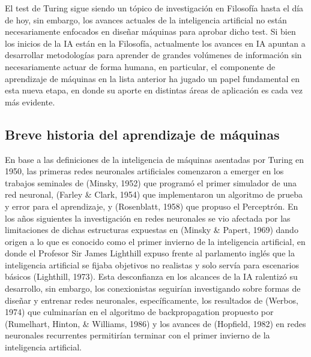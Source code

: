 El test de Turing sigue siendo un tópico de investigación en Filosofía hasta el día de hoy, sin embargo, los avances actuales de la inteligencia artificial no están necesariamente enfocados en diseñar máquinas para aprobar dicho test. Si bien los inicios de la IA están en la Filosofía, actualmente los avances en IA apuntan a desarrollar metodologías para aprender de grandes volúmenes de información sin necesariamente actuar de forma humana, en particular, el componente de aprendizaje de máquinas en la lista anterior ha jugado un papel fundamental en esta nueva etapa, en donde su aporte en distintas áreas de aplicación es cada vez más evidente. 


\subsection{Breve historia del aprendizaje de máquinas}

En base a las definiciones de la inteligencia de máquinas asentadas por Turing en 1950, las primeras redes neuronales artificiales comenzaron a emerger en los trabajos seminales de (Minsky, 1952) que programó el primer simulador de una red neuronal,  (Farley \& Clark, 1954) que implementaron un algoritmo de prueba y error para el aprendizaje, y (Rosenblatt, 1958) que propuso el Perceptrón. En los años siguientes la investigación en redes neuronales se vio afectada por las limitaciones de dichas estructuras expuestas en (Minsky \& Papert, 1969) dando origen a lo que es conocido como el primer invierno de la inteligencia artificial, en donde el Profesor Sir James Lighthill expuso frente al parlamento inglés que la inteligencia artificial se fijaba objetivos no realistas y solo servía para escenarios básicos (Lighthill, 1973). Esta desconfianza en los alcances de la IA ralentizó su desarrollo, sin embargo, los conexionistas  seguirían investigando sobre formas de diseñar y entrenar redes neuronales, específicamente, los resultados de (Werbos, 1974) que culminarían en el algoritmo de backpropagation propuesto por (Rumelhart, Hinton, \& Williams, 1986) y los avances de  (Hopfield, 1982) en redes neuronales recurrentes permitirían terminar con el primer invierno de la inteligencia artificial.  
 

